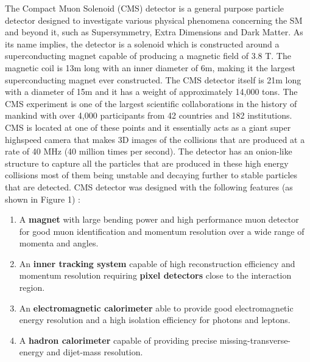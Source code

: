 
The Compact Muon Solenoid (CMS) detector is a general purpose particle detector designed to investigate various physical phenomena concerning the SM and beyond it, such as Supersymmetry, Extra Dimensions and Dark Matter. As its name implies, the detector is a solenoid which is  constructed around a superconducting magnet capable of producing a magnetic field of 3.8 T. The magnetic coil is 13m long with an inner diameter of 6m, making it the largest superconducting magnet ever constructed. The CMS detector itself is 21m long with a diameter of 15m and it has a weight of approximately 14,000 tons. The CMS experiment is one of the largest scientific collaborations in the history of mankind with over 4,000 participants from 42 countries and 182 institutions. CMS is located at one of these points and it essentially acts as a giant super highspeed camera that makes 3D images of the collisions that are produced at a rate of 40 MHz (40 million times per second). The detector has an onion-like structure to capture all the particles that are produced in these high energy collisions most of them being unstable and decaying further to stable particles that are detected.  CMS detector was designed with the following features (as shown in Figure 1) :

\begin{enumerate}
	\item{A \textbf{magnet} with large bending power and high performance muon detector for good muon
identification and momentum resolution over a wide range of momenta and angles.}

	\item{An \textbf{inner tracking system} capable of high reconstruction efficiency and momentum resolution
requiring \textbf{pixel detectors} close to the interaction region.}

	\item{An \textbf{electromagnetic calorimeter} able to provide good electromagnetic energy resolution and  
a high isolation efficiency for photons and leptons.}

	\item{A \textbf{hadron calorimeter} capable of providing precise missing-transverse-energy and dijet-mass  
resolution.}

\end{enumerate}

